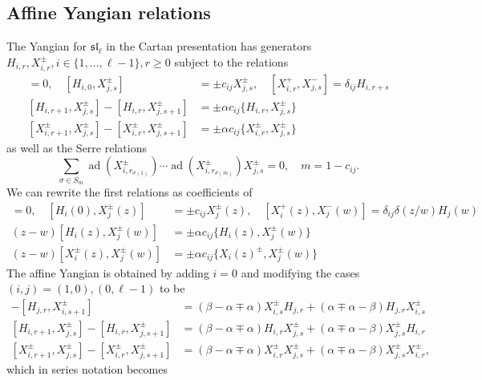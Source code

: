 \documentclass[11pt]{report}
\theoremstyle{definition}
\theoremstyle{remark}
\theoremstyle{remark}
\begin{document}
\subsection{Affine Yangian relations}

\cite{article:kodera:2015}

The Yangian for $\mathfrak{sl}_\ell$ in the Cartan presentation has generators $H_{i,r}, X_{i,r}^\pm, i \in \{ 1,...,\ell-1 \}, r \geq 0$ subject to the relations
\begin{align*}
[H_{i,r},H_{j,s}] = 0, \quad [H_{i,0},X_{j,s}^\pm] &= \pm c_{ij} X_{j,s}^\pm, \quad [X_{i,r}^+,X_{j,s}^-] = \delta_{ij} H_{i,r+s} \\
[H_{i,r+1},X_{j,s}^\pm] - [H_{i,r},X_{j,s+1}^\pm] &= \pm \alpha c_{ij} \{ H_{i,r}, X_{j,s}^\pm \} \\
[X_{i,r+1}^\pm,X_{j,s}^\pm] - [X_{i,r}^\pm,X_{j,s+1}^\pm] &= \pm \alpha c_{ij} \{ X_{i,r}^\pm, X_{j,s}^\pm \}
\end{align*}
as well as the Serre relations
\begin{equation*}
\sum_{\sigma \in S_m} \operatorname{ad}(X_{i,r_{\sigma(1)}}^\pm) \cdots \operatorname{ad}(X_{i,r_{\sigma(m)}}^\pm) X_{j,s}^\pm = 0, \quad m = 1-c_{ij}.
\end{equation*}
We can rewrite the first relations as coefficients of
\begin{align*}
[H_i(z),H_j(w)] = 0, \quad [H_i(0),X_j^\pm(z)] &= \pm c_{ij} X_j^\pm(z), \quad [X_i^+(z),X_j^-(w)] = \delta_{ij} \delta(z/w) H_j(w) \\
(z-w)[H_i(z),X_j^\pm(w)] &= \pm \alpha c_{ij} \{ H_i(z),X_j^\pm(w) \} \\
(z-w)[X_i^\pm(z),X_j^\pm(w)] &= \pm \alpha c_{ij} \{ X_i(z)^\pm,X_j^\pm(w) \}
\end{align*}
The affine Yangian is obtained by adding $i=0$ and modifying the cases $(i,j) = (1,0), (0,\ell-1)$ to be
\begin{align*}
[H_{j,r+1},X_{i,s}^\pm] - [H_{j,r},X_{i,s+1}^\pm] &= (\beta-\alpha \mp \alpha) X_{i,s}^\pm H_{j,r} + (\alpha \mp \alpha - \beta) H_{j,r} X_{i,s}^\pm \\
[H_{i,r+1},X_{j,s}^\pm] - [H_{i,r},X_{j,s+1}^\pm] &= (\beta-\alpha \mp \alpha) H_{i,r} X_{j,s}^\pm + (\alpha \mp \alpha - \beta) X_{j,s}^\pm H_{i,r} \\
[X_{i,r+1}^\pm,X_{j,s}^\pm] - [X_{i,r}^\pm,X_{j,s+1}^\pm] &= (\beta-\alpha \mp \alpha) X_{i,r}^\pm X_{j,s}^\pm + (\alpha \mp \alpha - \beta) X_{j,s}^\pm X_{i,r}^\pm,
\end{align*}
which in series notation becomes
\end{document}
